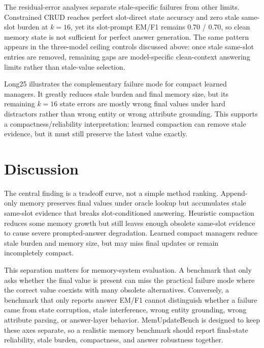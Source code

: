 \documentclass[11pt]{article}
\begin{document}
The residual-error analyses separate stale-specific failures from other limits. Constrained CRUD reaches perfect slot-direct state accuracy and zero stale same-slot burden at \(k=16\), yet its slot-prompt EM/F1 remains 0.70 / 0.70, so clean memory state is not sufficient for perfect answer generation. The same pattern appears in the three-model ceiling controls discussed above: once stale same-slot entries are removed, remaining gaps are model-specific clean-context answering limits rather than stale-value selection.

Long25 illustrates the complementary failure mode for compact learned managers. It greatly reduces stale burden and final memory size, but its remaining \(k=16\) state errors are mostly wrong final values under hard distractors rather than wrong entity or wrong attribute grounding. This supports a compactness/reliability interpretation: learned compaction can remove stale evidence, but it must still preserve the latest value exactly.

\section{Discussion}

The central finding is a tradeoff curve, not a simple method ranking. Append-only memory preserves final values under oracle lookup but accumulates stale same-slot evidence that breaks slot-conditioned answering. Heuristic compaction reduces some memory growth but still leaves enough obsolete same-slot evidence to cause severe prompted-answer degradation. Learned compact managers reduce stale burden and memory size, but may miss final updates or remain incompletely compact.

This separation matters for memory-system evaluation. A benchmark that only asks whether the final value is present can miss the practical failure mode where the correct value coexists with many obsolete alternatives. Conversely, a benchmark that only reports answer EM/F1 cannot distinguish whether a failure came from state corruption, stale interference, wrong entity grounding, wrong attribute parsing, or answer-layer behavior. MemUpdateBench is designed to keep these axes separate, so a realistic memory benchmark should report final-state reliability, stale burden, compactness, and answer robustness together.
\end{document}

